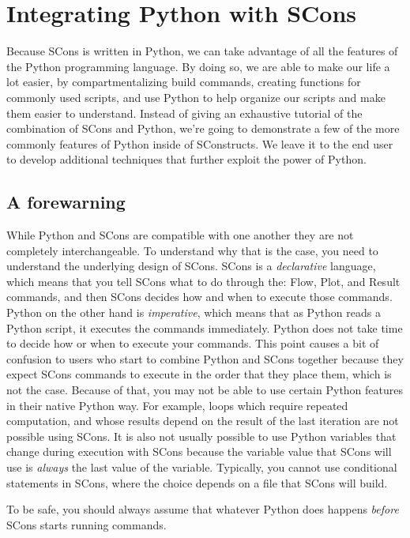 \section{Integrating Python with SCons}

Because SCons is written in Python, we can take advantage of all the features of the Python programming language.  By doing so, we are able to make our life a lot easier, by compartmentalizing build commands, creating functions for commonly used scripts, and use Python to help organize our scripts and make them easier to understand.  Instead of giving an exhaustive tutorial of the combination of SCons and Python, we're going to demonstrate a few of the more commonly features of Python inside of SConstructs.  We leave it to the end user to develop additional techniques that further exploit the power of Python.

\subsection{A forewarning}

While Python and SCons are compatible with one another they are not completely interchangeable.  To understand why that is the case, you need to understand the underlying design of SCons. SCons is a \emph{declarative} language, which means that you tell SCons what to do through the: Flow, Plot, and Result commands, and then SCons decides how and when to execute those commands.  Python on the other hand is \emph{imperative}, which means that as Python reads a Python script, it executes the commands immediately.  Python does not take time to decide how or when to execute your commands.  This point causes a bit of confusion to users who start to combine Python and SCons together because they expect SCons commands to execute in the order that they place them, which is not the case.  Because of that, you may not be able to use certain Python features in their native Python way.  For example, loops which require repeated computation, and whose results depend on the result of the last iteration are not possible using SCons.  It is also not usually possible to use Python variables that change during execution with SCons because the variable value that SCons will use is \emph{always} the last value of the variable.  Typically, you cannot use conditional statements in SCons, where the choice depends on a file that SCons will build.  

To be safe, you should always assume that whatever Python does happens \emph{before} SCons starts running commands.

